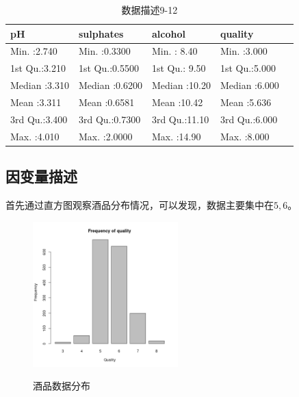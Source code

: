 \documentclass[fontset=ubuntu]{ctexart}
\begin{document}
        \begin{table}[ht]
            \centering
            \caption{数据描述9-12}
            \vspace{5pt}
            \begin{tabular}{lllll}
                \hline
                pH &   sulphates &    alcohol &    quality \\ 
                \hline
                Min.   :2.740   & Min.   :0.3300   & Min.   : 8.40   & Min.   :3.000   \\ 
                1st Qu.:3.210   & 1st Qu.:0.5500   & 1st Qu.: 9.50   & 1st Qu.:5.000   \\ 
                Median :3.310   & Median :0.6200   & Median :10.20   & Median :6.000   \\ 
                Mean   :3.311   & Mean   :0.6581   & Mean   :10.42   & Mean   :5.636   \\ 
                3rd Qu.:3.400   & 3rd Qu.:0.7300   & 3rd Qu.:11.10   & 3rd Qu.:6.000   \\ 
                Max.   :4.010   & Max.   :2.0000   & Max.   :14.90   & Max.   :8.000   \\ 
                \hline
            \end{tabular}
            \label{tab:description9-12}
            \end{table}

        \subsection{因变量描述}
            首先通过直方图观察酒品分布情况，可以发现，数据主要集中在$5, 6$。 
            \begin{figure}[htbp]
                \centering
                \includegraphics[width=0.5\textwidth]{../red-wine/figures/quality-frequency}
                \label{fig:quality}
                \caption{酒品数据分布}
            \end{figure}
\end{document}

